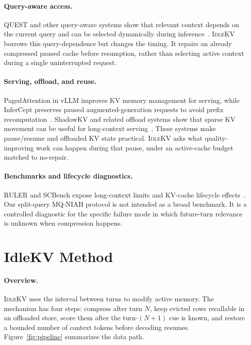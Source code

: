 \documentclass{article}
\newcommand{\idlekv}{\textsc{IdleKV}}
\begin{document}
\paragraph{Query-aware access.}
QUEST and other query-aware systems show that relevant context depends
on the current query and can be selected dynamically during
inference~\citep{quest}.
\idlekv{} borrows this query-dependence but changes the timing.
It repairs an already compressed paused cache before resumption, rather
than selecting active context during a single uninterrupted request.

\paragraph{Serving, offload, and reuse.}
PagedAttention in vLLM improves KV memory management for serving, while
InferCept preserves paused augmented-generation requests to avoid
prefix recomputation~\citep{vllm,infercept}.
ShadowKV and related offload systems show that sparse KV movement can
be useful for long-context serving~\citep{shadowkv}.
These systems make pause/resume and offloaded KV state practical.
\idlekv{} asks what quality-improving work can happen during that
pause, under an active-cache budget matched to no-repair.

\paragraph{Benchmarks and lifecycle diagnostics.}
RULER and SCBench expose long-context limits and KV-cache lifecycle
effects~\citep{ruler,scbench}.
Our split-query MQ-NIAH protocol is not intended as a broad benchmark.
It is a controlled diagnostic for the specific failure mode in which
future-turn relevance is unknown when compression happens.

\section{IdleKV Method}
\label{sec:method}

\paragraph{Overview.}
\idlekv{} uses the interval between turns to modify active memory.
The mechanism has four steps: compress after turn $N$, keep evicted rows
recallable in an offloaded store, score them after the turn-$(N+1)$ cue
is known, and restore a bounded number of context tokens before decoding
resumes.
Figure~\ref{fig:pipeline} summarizes the data path.
\end{document}
